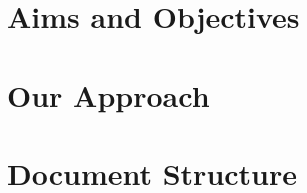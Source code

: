 \section{Aims and Objectives} 
\blindtext

\section{Our Approach} 
\blindtext

\section{Document Structure}
\blindtext
